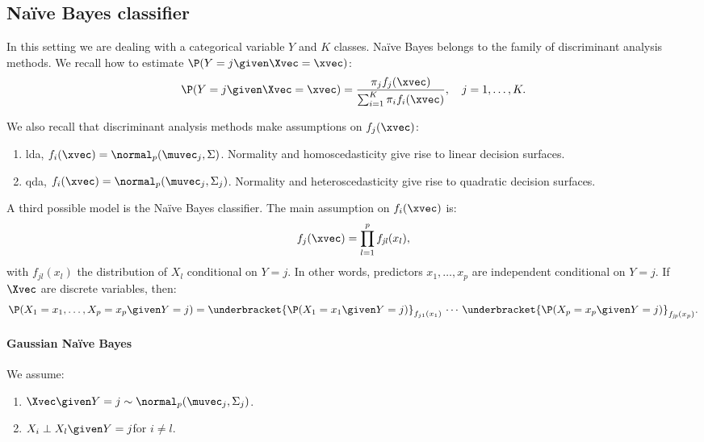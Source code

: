 \subsection{Na\"ive Bayes classifier}

In this setting we are dealing with a categorical variable $Y$ and $K$ classes. Na\"ive Bayes belongs to the family of discriminant analysis methods. We recall how to estimate $\P(Y = j \given \Xvec = \xvec)$:
\begin{equation}
    \P(Y = j \given \Xvec = \xvec) = \frac{\pi_j f_j(\xvec)}{\sum_{i = 1}^K \pi_i f_i(\xvec)},\quad j = 1, \dots, K.
\end{equation}

We also recall that discriminant analysis methods make assumptions on $f_j(\xvec)$:
\begin{enumerate}[beginpenalty=10000]
    \item \acs{lda}, $f_i(\xvec) = \normal_p(\muvec_j, \Sigma)$. Normality and homoscedasticity give rise to linear decision surfaces.
    \item \acs{qda}, $f_i(\xvec) = \normal_p(\muvec_j, \Sigma_j)$. Normality and heteroscedasticity give rise to quadratic decision surfaces.
\end{enumerate}

A third possible model is the Na\"ive Bayes classifier. The main assumption on $f_i(\xvec)$ is:
\begin{equation}
    f_j(\xvec) = \prod_{l = 1}^p f_{\mathit{jl}}(x_l),
\end{equation}
with $f_{\mathit{jl}}(x_l)$ the distribution of $X_l$ conditional on $Y = j$. In other words, predictors $x_1, \ldots, x_p$ are independent conditional on $Y = j$. If $\Xvec$ are discrete variables, then:
\begin{equation}
    \P(X_1 = x_1, \ldots, X_p = x_p \given Y = j) = \underbracket{\P(X_1 = x_1 \given Y = j)}_{f_{j1}(x_1)}\,\cdots\,\underbracket{\P(X_p = x_p \given Y = j)}_{f_{\mathit{jp}}(x_p)}.
\end{equation}

\paragraph{Gaussian Na\"ive Bayes}

We assume:
\begin{enumerate}
    \item\label{assumption:gaussian} $\Xvec \given Y = j \sim \normal_p(\muvec_j, \Sigma_j)$. 
    \item\label{assumption:naive}
          $X_i \perp X_l \given Y = j$\quad for $i \neq l$. 
\end{enumerate}

